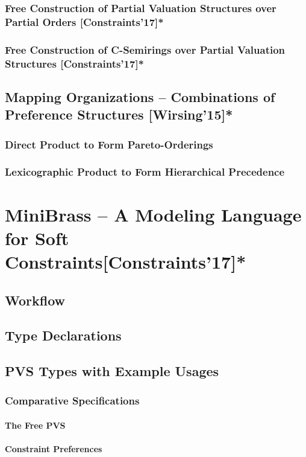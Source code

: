 \documentclass[10pt,a4paper]{book}
\begin{document}
\subsection{Free Construction of Partial Valuation Structures over Partial Orders [Constraints'17]*}
\subsection{Free Construction of C-Semirings over Partial Valuation Structures [Constraints'17]*}
\section{Mapping Organizations -- Combinations of Preference Structures [Wirsing'15]*}
\subsection{Direct Product to Form Pareto-Orderings}
\subsection{Lexicographic Product to Form Hierarchical Precedence}

\chapter{MiniBrass -- A Modeling Language for Soft Constraints[Constraints'17]*}
\section{Workflow}
\section{Type Declarations}
\section{PVS Types with Example Usages}
\subsection{Comparative Specifications}
\subsubsection{The Free PVS}
\subsubsection{Constraint Preferences}
\end{document}

